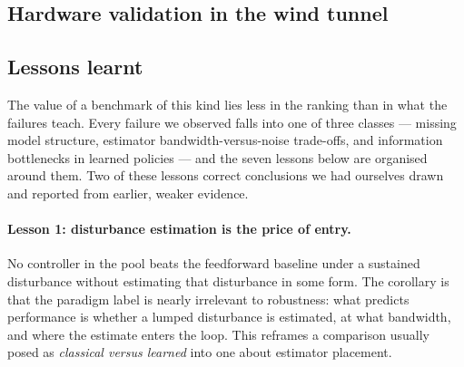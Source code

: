 \subsection{Hardware validation in the wind tunnel}
\label{sec:results:hardware}


\subsection{Lessons learnt}
\label{sec:results:lessons}

The value of a benchmark of this kind lies less in the ranking than in what the failures
teach. Every failure we observed falls into one of three classes --- missing model
structure, estimator bandwidth-versus-noise trade-offs, and information bottlenecks in
learned policies --- and the seven lessons below are organised around them. Two of these
lessons correct conclusions we had ourselves drawn and reported from earlier, weaker
evidence.

\paragraph{Lesson 1: disturbance estimation is the price of entry.}
No controller in the pool beats the feedforward baseline under a sustained disturbance
without estimating that disturbance in some form. The corollary is that the paradigm
label is nearly irrelevant to robustness: what predicts performance is whether a lumped
disturbance is estimated, at what bandwidth, and where the estimate enters the loop.
This reframes a comparison usually posed as \emph{classical versus learned} into one
about estimator placement.

